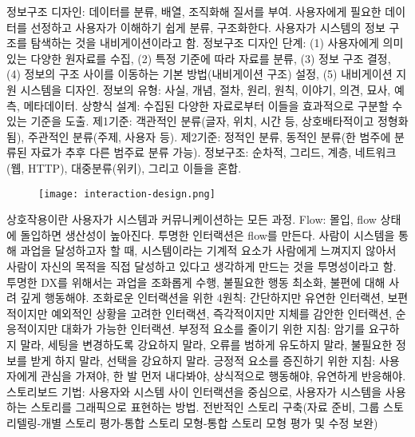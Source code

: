 
\bitmz
  \itm 정보구조 디자인: 데이터를 분류, 배열, 조직화해 질서를 부여. 사용자에게 필요한 데이터를 선정하고 사용자가 이해하기 쉽게 분류, 구조화한다.
  \itm 사용자가 시스템의 정보 구조를 탐색하는 것을 내비게이션이라고 함.
  \itm 정보구조 디자인 단계: (1) 사용자에게 의미있는 다양한 원자료를 수집, (2) 특정 기준에 따라 자료를 분류, (3) 정보 구조 결정, (4) 정보의 구조 사이를 이동하는 기본 방법(내비게이션 구조) 설정, (5) 내비게이션 지원 시스템을 디자인.
  \itm 정보의 유형: 사실, 개념, 절차, 원리, 원칙, 이야기, 의견, 묘사, 예측, 메타데이터.
  \itm 상향식 설계: 수집된 다양한 자료로부터 이들을 효과적으로 구분할 수 있는 기준을 도출. 제1기준: 객관적인 분류(글자, 위치, 시간 등, 상호배타적이고 정형화됨), 주관적인 분류(주제, 사용자 등). 제2기준: 정적인 분류, 동적인 분류(한 범주에 분류된 자료가 추후 다른 범주료 분류 가능).
  \itm 정보구조: 순차적, 그리드, 계층, 네트워크(웹, HTTP), 대중분류(위키), 그리고 이들을 혼합.
\eitmz


\vspace{-3mm}
\begin{figure}[h] \centering \texttt{[image: interaction-design.png]} \end{figure}
\vspace{-3mm}

\bitmz
  \itm 상호작용이란 사용자가 시스템과 커뮤니케이션하는 모든 과정.
  \itm Flow: 몰입, flow 상태에 돌입하면 생산성이 높아진다. 투명한 인터랙션은 flow를 만든다. 사람이 시스템을 통해 과업을 달성하고자 할 때, 시스템이라는 기계적 요소가 사람에게 느껴지지 않아서 사람이 자신의 목적을 직접 달성하고 있다고 생각하게 만드는 것을 투명성이라고 함. 투명한 DX를 위해서는 과업을 조화롭게 수행, 불필요한 행동 최소화, 불편에 대해 사려 깊게 행동해야.
  \itm 조화로운 인터랙션을 위한 4원칙: 간단하지만 유연한 인터랙션, 보편적이지만 예외적인 상황을 고려한 인터랙션, 즉각적이지만 지체를 감안한 인터랙션, 순응적이지만 대화가 가능한 인터랙션.
  \itm 부정적 요소를 줄이기 위한 지침: 암기를 요구하지 말라, 세팅을 변경하도록 강요하지 말라, 오류를 범하게 유도하지 말라, 불필요한 정보를 받게 하지 말라, 선택을 강요하지 말라.
  \itm 긍정적 요소를 증진하기 위한 지침: 사용자에게 관심을 가져야, 한 발 먼저 내다봐야, 상식적으로 행동해야, 유연하게 반응해야.
  \itm 스토리보드 기법: 사용자와 시스템 사이 인터랙션을 중심으로, 사용자가 시스템을 사용하는 스토리를 그래픽으로 표현하는 방법. 전반적인 스토리 구축(자료 준비, 그룹 스토리텔링-개별 스토리 평가-통합 스토리 모형-통합 스토리 모형 평가 및 수정 보완)
\eitmz

